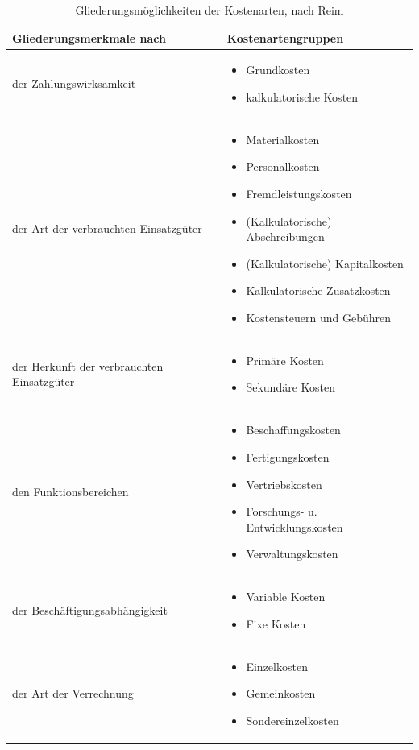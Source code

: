 \begin{table}
\begin{tabularx}{\textwidth}{|X|X|}
	\hline \textbf{Gliederungsmerkmale nach}  &  \textbf{Kostenartengruppen}\\ 
	\hline der Zahlungswirksamkeit  & \begin{itemize}
		\item Grundkosten
		\item kalkulatorische Kosten
	\end{itemize} \\ 
	\hline der Art der verbrauchten Einsatzgüter & \begin{itemize}
		\item Materialkosten
		\item Personalkosten
		\item Fremdleistungskosten
		\item (Kalkulatorische) Abschreibungen
		\item (Kalkulatorische) Kapitalkosten
		\item Kalkulatorische Zusatzkosten
		\item Kostensteuern und Gebühren
	\end{itemize} \\ 
	\hline der Herkunft der verbrauchten Einsatzgüter & \begin{itemize}
		\item Primäre Kosten
		\item Sekundäre Kosten	
	\end{itemize}  \\ 
	\hline den Funktionsbereichen &\begin{itemize}
		\item Beschaffungskosten
		\item Fertigungskosten
		\item Vertriebskosten
		\item Forschungs- u. Entwicklungskosten
		\item Verwaltungskosten
	\end{itemize} \\ 
	\hline der Beschäftigungsabhängigkeit & \begin{itemize}
		\item Variable Kosten
		\item Fixe Kosten
	\end{itemize} \\ 
	\hline der Art der Verrechnung & \begin{itemize}
		\item Einzelkosten
		\item Gemeinkosten
		\item Sondereinzelkosten
	\end{itemize} \\ 
	\hline 
\end{tabularx}
	\caption{Gliederungsmöglichkeiten der Kostenarten, nach Reim}
	\label{tab_gliederung_kostenarten}
\end{table}










